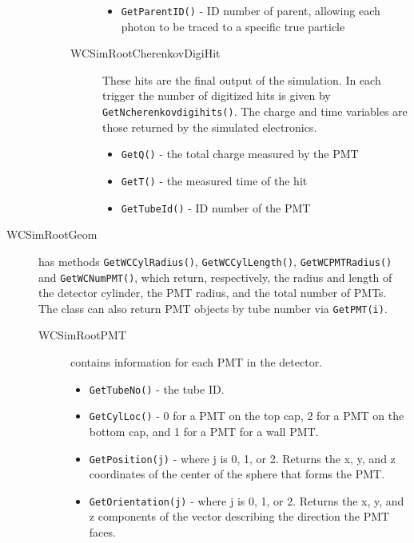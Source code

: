 \begin{description}
\begin{description}
\begin{description}
\begin{itemize}
          \item \texttt{GetParentID()} - ID number of parent, allowing each photon to be traced to a specific true particle
          \end{itemize}
      \item[WCSimRootCherenkovDigiHit] These hits are the final output of the simulation. In each trigger the number of digitized hits is given by \texttt{GetNcherenkovdigihits()}.  The charge and time variables are those returned by the simulated electronics.
          \begin{itemize}
          \item \texttt{GetQ()} - the total charge measured by the PMT
          \item \texttt{GetT()} - the measured time of the hit
          \item \texttt{GetTubeId()} - ID number of the PMT
          \end{itemize}
    \end{description}
  \end{description}
\end{description}


\begin{description}
  \item[WCSimRootGeom]  has methods \texttt{GetWCCylRadius()}, \texttt{GetWCCylLength()}, \texttt{GetWCPMTRadius()} and \texttt{GetWCNumPMT()}, which return, respectively, the radius and length of the detector cylinder, the PMT radius, and the total number of PMTs.  The class can also return PMT objects by tube number via \texttt{GetPMT(i)}.
    \begin{description}
    \item[WCSimRootPMT] contains information for each PMT in the detector.
    	\begin{itemize}
                \item \texttt{GetTubeNo()} - the tube ID.
		\item \texttt{GetCylLoc()} - 0 for a PMT on the top cap, 2 for a PMT on the bottom  cap, and 1 for a PMT for a wall PMT.
		\item \texttt{GetPosition(j)} - where j is 0, 1, or 2.  Returns the x, y, and z coordinates of the center of the sphere that forms the PMT.
		\item \texttt{GetOrientation(j)} - where j is 0, 1, or 2.  Returns the x, y, and z components of the vector describing the direction the PMT faces.
         \end{itemize}
    \end{description}
\end{description}


